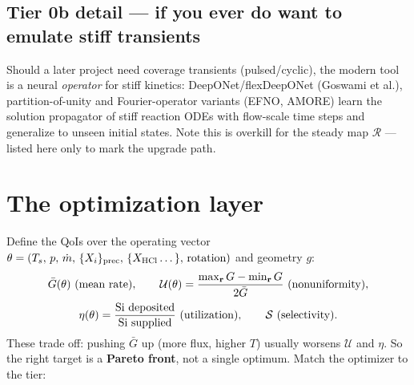 \documentclass[11pt]{article}
\newcommand{\R}{\mathcal{R}}
\begin{document}
\subsection{Tier 0b detail --- if you ever do want to emulate stiff transients}
Should a later project need coverage transients (pulsed/cyclic), the modern tool is a neural \emph{operator} for stiff kinetics: DeepONet/flexDeepONet (Goswami et al.), partition-of-unity and Fourier-operator variants (EFNO, AMORE) learn the solution propagator of stiff reaction ODEs with flow-scale time steps and generalize to unseen initial states. Note this is overkill for the steady map $\R$ --- listed here only to mark the upgrade path.

\section{The optimization layer}
\label{sec:opt}

Define the QoIs over the operating vector $\theta=(T_s,\,p,\,\dot m,\,\{X_i\}_{\text{prec}},\,\{X_{\ce{HCl}}\dots\},\,\text{rotation})$ and geometry $g$:
\begin{gather}
\bar G(\theta)\ \text{(mean rate)},\qquad
\mathcal{U}(\theta)=\frac{\max_{\mathbf r}G-\min_{\mathbf r}G}{2\bar G}\ \text{(nonuniformity)},\notag\\[2pt]
\eta(\theta)=\frac{\text{Si deposited}}{\text{Si supplied}}\ \text{(utilization)},\qquad
\mathcal{S}\ \text{(selectivity)} .
\end{gather}
These trade off: pushing $\bar G$ up (more flux, higher $T$) usually worsens $\mathcal U$ and $\eta$. So the right target is a \textbf{Pareto front}, not a single optimum. Match the optimizer to the tier:
\end{document}
